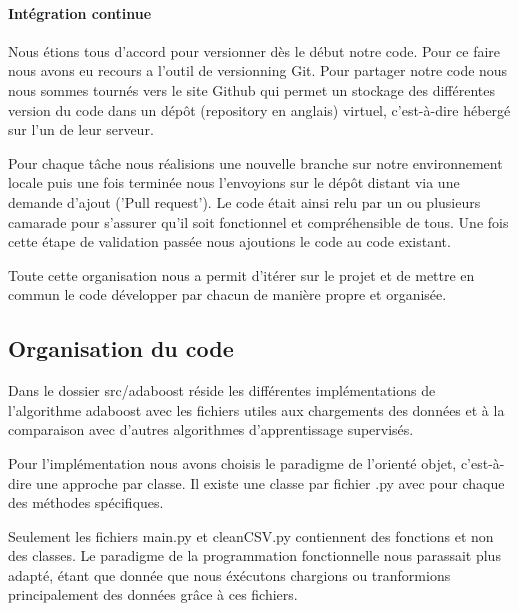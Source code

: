 \documentclass{article}
\begin{document}
\paragraph{Intégration continue}

Nous étions tous d'accord pour versionner dès le début notre code. Pour ce faire nous avons eu recours a l'outil de versionning Git. 
Pour partager notre code nous nous sommes tournés vers le site Github qui permet un stockage des différentes version du code dans un dépôt (repository en anglais) virtuel, c'est-à-dire hébergé sur l'un de leur serveur.

Pour chaque tâche nous réalisions une nouvelle branche sur notre environnement locale puis une fois terminée nous l'envoyions sur le dépôt distant via une demande d'ajout ('Pull request'). 
Le code était ainsi relu par un ou plusieurs camarade pour s'assurer qu'il soit fonctionnel et compréhensible de tous. Une fois cette étape de validation passée nous ajoutions le code au code existant. 

Toute cette organisation nous a permit d'itérer sur le projet et de mettre en commun le code développer par chacun de manière propre et organisée. 

\subsection{Organisation du code}

Dans le dossier src/adaboost réside les différentes implémentations de l'algorithme adaboost avec les fichiers utiles aux chargements des données et à la comparaison avec d'autres algorithmes d'apprentissage supervisés.

Pour l'implémentation nous avons choisis le paradigme de l'orienté objet, c'est-à-dire une approche par classe. Il existe une classe par fichier .py avec pour chaque des méthodes spécifiques. 

Seulement les fichiers main.py et cleanCSV.py contiennent des fonctions et non des classes. Le paradigme de la programmation fonctionnelle nous parassait plus adapté, étant que donnée que nous éxécutons chargions ou tranformions principalement des données grâce à ces fichiers.  
\end{document}
